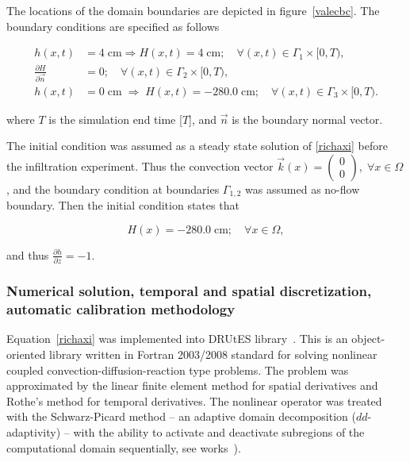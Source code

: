 \documentclass[review]{myarticle}
\newenvironment{lineq}
    {\begin{linenomath*}
    \begin{equation}
    }
    { 
    \end{equation} 
    \end{linenomath*}
    }
\begin{document}
The locations of the domain boundaries are depicted in figure~\ref{valecbc}. The boundary conditions are specified as follows
\begin{lineq} 
\begin{split}
h(x,t) &= 4 \; \mbox{cm} \Rightarrow H(x,t) = 4 \; \mbox{cm}; \quad \forall (x,t) \in \Gamma_1 \times [0,T), \\
\frac{\partial H}{\partial \vec{n}} &= 0; \quad \forall (x,t) \in \Gamma_2 \times [0,T), \\
h(x,t) &= 0  \; \mbox{cm}  \; \Rightarrow \; H(x,t) = -280.0  \; \mbox{cm}; \quad \forall (x,t) \in \Gamma_3 \times [0,T).
\end{split}
\end{lineq}
where $T$ is the simulation end time [$T$], and $\vec{n}$ is the boundary normal vector.

The initial condition was assumed as a steady state solution of \eqref{richaxi} before the infiltration experiment. Thus the convection vector $\vec{k}(x) = \left( \begin{smallmatrix} 0 \\ 0 \end{smallmatrix} \right), \; \forall x \in \Omega$, and the boundary condition at boundaries $\Gamma_{1,2}$ was assumed as no-flow boundary. Then the initial condition states that 
\begin{lineq}
H(x) = -280.0 \; \mbox{cm}; \quad \forall x \in \Omega,
\end{lineq}
and thus $\frac{\partial h}{\partial z} = -1$.


\subsubsection{Numerical solution, temporal and spatial discretization, automatic calibration methodology}%
\label{trapoty}

Equation~\eqref{richaxi} was implemented into DRUtES library~\citep{drutes, mojeamc}. This is an object-oriented library written in Fortran 2003/2008 standard for solving nonlinear coupled convection-diffusion-reaction type problems. The problem was approximated by the linear finite element method for spatial derivatives and Rothe's method for temporal derivatives. The nonlinear operator was treated with the Schwarz-Picard method -- an adaptive domain decomposition  ($dd$-adaptivity) -- with the ability to activate and deactivate subregions of the computational domain sequentially, see works~\citep{mojecomp, mojejcam2, mojeamc2}).
\end{document}
